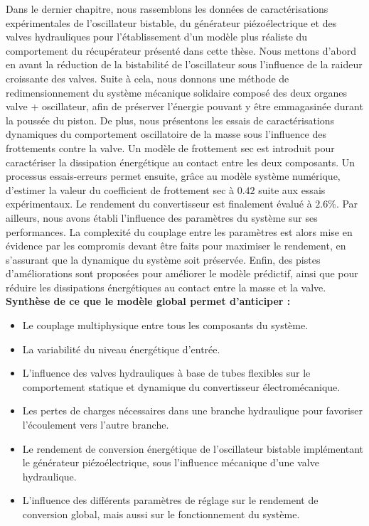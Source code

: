 Dans le dernier chapitre, nous rassemblons les données de caractérisations expérimentales de l'oscillateur bistable, du générateur piézoélectrique et des valves hydrauliques pour l'établissement d'un modèle plus réaliste du comportement du récupérateur présenté dans cette thèse. Nous mettons d'abord en avant la réduction de la bistabilité de l'oscillateur sous l'influence de la raideur croissante des valves. Suite à cela, nous donnons une méthode de redimensionnement du système mécanique solidaire composé des deux organes valve + oscillateur, afin de préserver l'énergie pouvant y être emmagasinée durant la poussée du piston. De plus, nous présentons les essais de caractérisations dynamiques du comportement oscillatoire de la masse sous l'influence des frottements contre la valve. Un modèle de frottement sec est introduit pour caractériser la dissipation énergétique au contact entre les deux composants. Un processus essais-erreurs permet ensuite, grâce au modèle système numérique, d'estimer la valeur du coefficient de frottement sec à $0.42$ suite aux essais expérimentaux. Le rendement du convertisseur est finalement évalué à $2.6$\%. Par ailleurs, nous avons établi l'influence des paramètres du système sur ses performances. La complexité du couplage entre les paramètres est alors mise en évidence par les compromis devant être faits pour maximiser le rendement, en s'assurant que la dynamique du système soit préservée. Enfin, des pistes d'améliorations sont proposées pour améliorer le modèle prédictif, ainsi que pour réduire les dissipations énergétiques au contact entre la masse et la valve. \\
\newline 
\textbf{Synthèse de ce que le modèle global permet d'anticiper :}
\begin{itemize}[label=$\circ$]
      \item Le couplage multiphysique entre tous les composants du système.
      \item La variabilité du niveau énergétique d'entrée.
      \item L'influence des valves hydrauliques à base de tubes flexibles sur le comportement statique et dynamique du convertisseur électromécanique.
      \item Les pertes de charges nécessaires dans une branche hydraulique pour favoriser l'écoulement vers l'autre branche.
      \item Le rendement de conversion énergétique de l'oscillateur bistable implémentant le générateur piézoélectrique, sous l'influence mécanique d'une valve hydraulique.
      \item L'influence des différents paramètres de réglage sur le rendement de conversion global, mais aussi sur le fonctionnement du système.
\end{itemize}
